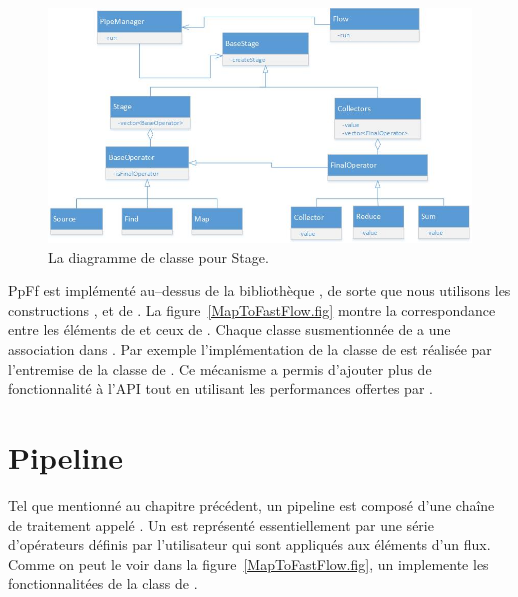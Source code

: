\begin{figure}[ht]
\centering
     \includegraphics[width=1.0\textwidth]{Figures/StagesClassDiagramme.jpg}
      \caption{La diagramme de classe pour Stage.}
       \label{StagesClassDiagramme.fig}
\end{figure}






PpFf est impl\'ement\'e au--dessus de la biblioth\`eque , de sorte que nous utilisons les constructions ,  et  de . La figure~\ref{MapToFastFlow.fig} montre la correspondance entre les \'el\'ements de  et ceux de . Chaque classe susmentionn\'ee de  a une association dans . Par exemple l'impl\'ementation de la classe  de  est r\'ealis\'ee par l'entremise de la classe  de . Ce m\'ecanisme a permis d'ajouter plus de fonctionnalit\'e \`a l'API tout en utilisant les performances offertes par .




\section{Pipeline}

Tel que mentionn\'e au chapitre pr\'ec\'edent, un pipeline est compos\'e d'une cha\^ine de traitement appel\'e . Un  est repr\'esent\'e essentiellement par une s\'erie d'op\'erateurs d\'efinis par l'utilisateur qui sont appliqu\'es aux \'el\'ements d'un flux. Comme on peut le voir dans la figure~\ref{MapToFastFlow.fig}, un  implemente les fonctionnalit\'ees de la class  de . 

